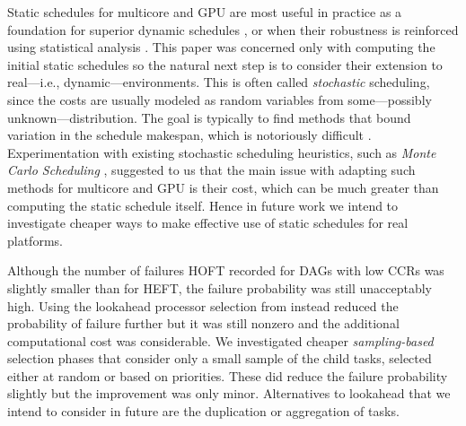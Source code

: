 \documentclass[runningheads]{llncs}
\begin{document}
Static schedules for multicore and GPU are most useful in practice as a foundation for superior dynamic schedules \cite{agullo2016}, or when their robustness is reinforced using statistical analysis \cite{ZHENG20131673}. This paper was concerned only with computing the initial static schedules so the natural next step is to consider their extension to real---i.e., dynamic---environments. This is often called {\em stochastic} scheduling, since the costs are usually modeled as random variables from some---possibly unknown---distribution. The goal is typically to find methods that bound variation in the schedule makespan, which is notoriously difficult \cite{hagstrom88}. Experimentation with existing stochastic scheduling heuristics, such as {\em Monte Carlo Scheduling} \cite{ZHENG20131673}, suggested to us that the main issue with adapting such methods for multicore and GPU is their cost, which can be much greater than computing the static schedule itself. Hence in future work we intend to investigate cheaper ways to make effective use of static schedules for real platforms.  

Although the number of failures HOFT recorded for DAGs with low CCRs was slightly smaller than for HEFT, the failure probability was still unacceptably high. Using the lookahead processor selection from \cite{bittencourt10} instead reduced the probability of failure further but it was still nonzero and the additional computational cost was considerable. We investigated cheaper {\em sampling-based} selection phases that consider only a small sample of the child tasks, selected either at random or based on priorities. These did reduce the failure probability slightly but the improvement was only minor. Alternatives to lookahead that we intend to consider in future are the duplication \cite{duplication} or aggregation of tasks.





%
%
%
 
 
\end{document}
